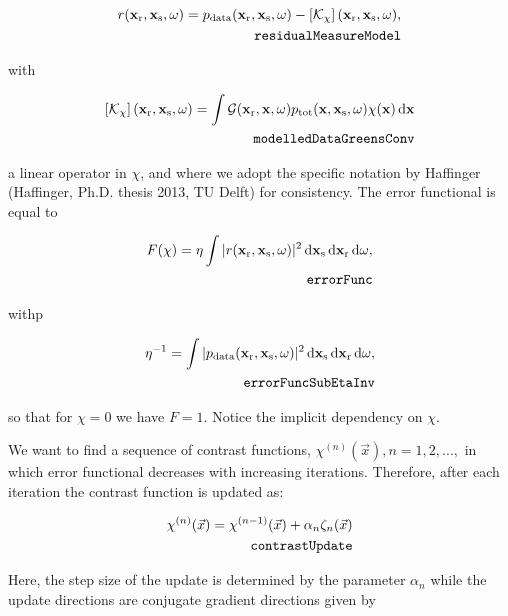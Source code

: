\documentclass[10pt,a4paper]{article}
\newcommand{\df}[1]{\, \ensuremath{\mbox{d}#1}}
\newcommand{\xs}{\mathbf{x}_\text{s}}
\newcommand{\xr}{\mathbf{x}_\text{r}}
\newcommand{\x}{\mathbf{x}}
\begin{document}
\begin{align} \label{eq:residualMeasureModel} r(\xr, \xs, \omega) =
p_{\text{data}}(\xr, \xs, \omega) - \left[\mathcal{K}_\chi
\right](\xr, \xs, \omega),\\
\tag*{\texttt{residualMeasureModel}}
\end{align}

with

\begin{align} \label{eq:modelledDataGreensConv} \left[\mathcal{K}_\chi \right](\xr,
\xs, \omega) = \int \mathcal{G}(\xr, \x, \omega) p_\text{tot}(\x, \xs,
\omega) \chi(\x) \df{\x}\\
\tag*{\texttt{modelledDataGreensConv}}
\end{align}

a linear operator in $\chi$, and where we adopt the specific notation
by Haffinger (Haffinger, Ph.D. thesis 2013, TU Delft) for consistency.
The error functional is equal to

\begin{align} \label{eq:errorFunc} F(\chi) = \eta \int |r(\xr, \xs,
\omega)|^2 \df{\mathbf{x}_\text{s}} \df{\xr}
\df{\omega},\\
\tag*{\texttt{errorFunc}}
\end{align}

withp	

\begin{align} \label{eq:errorFuncSubEtaInv} \eta^{-1} = \int | p_\text{data}(\xr,
\xs, \omega) |^2 \df{\xs} \df{\xr} \df{\omega}, \\
\tag*{\texttt{errorFuncSubEtaInv}} 
 \end{align}

so that for $\chi = 0$ we have $F = 1$. Notice the implicit dependency
on $\chi$.

We want to find a sequence of contrast functions,
$\chi^{(n)}(\vec{x}), n = 1,2,...,$ in which error functional
decreases with increasing iterations. Therefore, after each iteration
the contrast function is updated as:

\begin{align} \label{eq:contrastUpdate} \chi^{(n)}(\vec{x}) =
\chi^{(n-1)}(\vec{x}) + \alpha_n\zeta_n(\vec{x})\\
\tag*{\texttt{contrastUpdate}}
\end{align}

Here, the step size of the update is determined by the parameter
$\alpha_n$ while the update directions are conjugate gradient
directions given by
\end{document}
